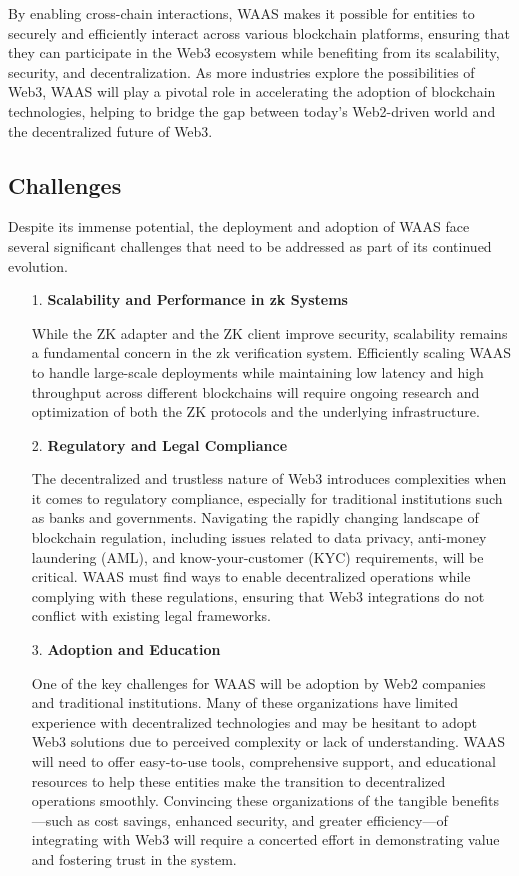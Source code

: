 By enabling cross-chain interactions, WAAS makes it possible for entities to securely and efficiently interact across various blockchain platforms, ensuring that they can participate in the Web3 ecosystem while benefiting from its scalability, security, and decentralization. As more industries explore the possibilities of Web3, WAAS will play a pivotal role in accelerating the adoption of blockchain technologies, helping to bridge the gap between today’s Web2-driven world and the decentralized future of Web3.

\subsection{Challenges}

Despite its immense potential, the deployment and adoption of WAAS face several significant challenges that need to be addressed as part of its continued evolution.

\begin{itemize}
    \item[1.] \textbf{Scalability and Performance in zk Systems}
    
   While the ZK adapter and the ZK client improve security, scalability remains a fundamental concern in the zk verification system.  Efficiently scaling WAAS to handle large-scale deployments while maintaining low latency and high throughput across different blockchains will require ongoing research and optimization of both the ZK protocols and the underlying infrastructure.

   \item[2.] \textbf{Regulatory and Legal Compliance}
   
   The decentralized and trustless nature of Web3 introduces complexities when it comes to regulatory compliance, especially for traditional institutions such as banks and governments. Navigating the rapidly changing landscape of blockchain regulation, including issues related to data privacy, anti-money laundering (AML), and know-your-customer (KYC) requirements, will be critical. WAAS must find ways to enable decentralized operations while complying with these regulations, ensuring that Web3 integrations do not conflict with existing legal frameworks.

    \item[3.] \textbf{Adoption and Education}
    
   One of the key challenges for WAAS will be adoption by Web2 companies and traditional institutions. Many of these organizations have limited experience with decentralized technologies and may be hesitant to adopt Web3 solutions due to perceived complexity or lack of understanding. WAAS will need to offer easy-to-use tools, comprehensive support, and educational resources to help these entities make the transition to decentralized operations smoothly. Convincing these organizations of the tangible benefits—such as cost savings, enhanced security, and greater efficiency—of integrating with Web3 will require a concerted effort in demonstrating value and fostering trust in the system.
\end{itemize}

